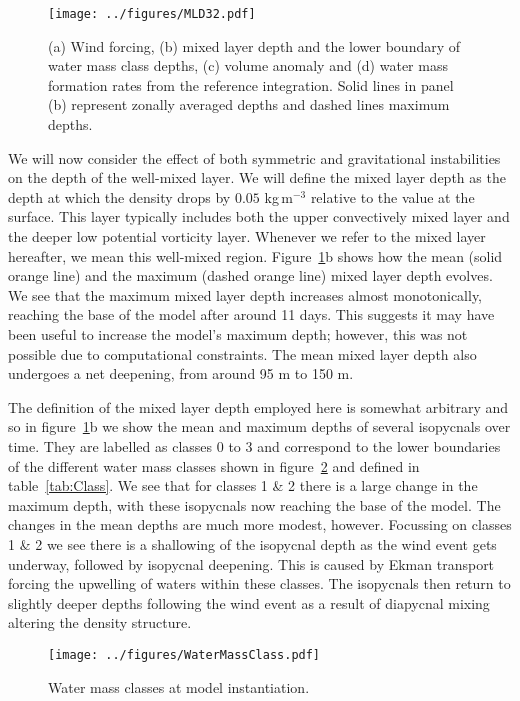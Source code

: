 \begin{figure} 
    \centering
    \texttt{[image: ../figures/MLD32.pdf]}
    \caption{(a) Wind forcing, (b) mixed layer depth and the lower boundary of water mass class depths, (c) volume anomaly and (d) water mass formation rates from the reference integration. Solid lines in panel (b) represent zonally averaged depths and dashed lines maximum depths.}
    \label{fig:EnsStandardMLD}
\end{figure}

We will now consider the effect of both symmetric and gravitational instabilities on the depth of the well-mixed layer. We will define the mixed layer depth as the depth at which the density drops by $0.05$ kg\,m$^{-3}$ relative to the value at the surface. This layer typically includes both the upper convectively mixed layer and the deeper low potential vorticity layer. Whenever we refer to the mixed layer hereafter, we mean this well-mixed region. Figure~\ref{fig:EnsStandardMLD}b shows how the mean (solid orange line) and the maximum (dashed orange line) mixed layer depth evolves. We see that the maximum mixed layer depth increases almost monotonically, reaching the base of the model after around 11 days. This suggests it may have been useful to increase the model's maximum depth; however, this was not possible due to computational constraints. The mean mixed layer depth also undergoes a net deepening, from around 95 m to 150 m.

The definition of the mixed layer depth employed here is somewhat arbitrary and so in figure~\ref{fig:EnsStandardMLD}b we show the mean and maximum depths of several isopycnals over time. They are labelled as classes 0 to 3 and correspond to the lower boundaries of the different water mass classes shown in figure~\ref{fig:WaterClass} and defined in table~\ref{tab:Class}. We see that for classes 1 \& 2 there is a large change in the maximum depth, with these isopycnals now reaching the base of the model. The changes in the mean depths are much more modest, however. Focussing on classes 1 \& 2 we see there is a shallowing of the isopycnal depth as the wind event gets underway, followed by isopycnal deepening. This is caused by Ekman transport forcing the upwelling of waters within these classes. The isopycnals then return to slightly deeper depths following the wind event as a result of diapycnal mixing altering the density structure.

\begin{figure}[p]
    \centering
    \texttt{[image: ../figures/WaterMassClass.pdf]}
    \caption{Water mass classes at model instantiation.}
    \label{fig:WaterClass}
\end{figure}

